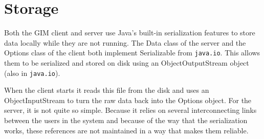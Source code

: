 \section{Storage}
\label{storage}

Both the GIM client and server use Java's built-in serialization features to store data locally while they are not running. The Data class of the server and the Options class of the client both implement Serializable from \texttt{java.io}. This allows them to be serialized and stored on disk using an ObjectOutputStream object (also in \texttt{java.io}).

When the client starts it reads this file from the disk and uses an ObjectInputStream to turn the raw data back into the Options object. For the server, it is not quite so simple. Because it relies on several interconnecting links between the users in the system and because of the way that the serialization works, these references are not maintained in a way that makes them reliable. 
